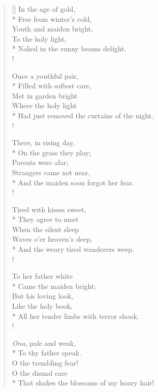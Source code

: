 \documentclass[MAIN]{subfiles}
\begin{document}
\settowidth{\versewidth}{Had just removed the curtains of the night.}
\begin{verse}[\versewidth]
\vin In the age of gold,\\*
\vin Free from winter's cold,\\
\vin Youth and maiden bright,\\
\vin To the holy light,\\*
Naked in the sunny beams delight.\\!

\vin Once a youthful pair,\\*
\vin Filled with softest care,\\
\vin Met in garden bright\\
\vin Where the holy light\\*
Had just removed the curtains of the night.\\!

\vin There, in rising day,\\*
\vin On the grass they play;\\
\vin Parents were afar;\\
\vin Strangers came not near,\\*
And the maiden soon forgot her fear.\\!

\vin Tired with kisses sweet,\\*
\vin They agree to meet\\
\vin When the silent sleep\\
\vin Waves o'er heaven's deep,\\*
And the weary tired wanderers weep.\\!

\vin To her father white\\*
\vin Came the maiden bright;\\
\vin But his loving look,\\
\vin Like the holy book,\\*
All her tender limbs with terror shook.\\!

\vin \emph{Ona}, pale and weak,\\*
\vin To thy father speak.\\
\vin O the trembling fear!\\
\vin O the dismal care\\*
That shakes the blossoms of my hoary hair!
\end{verse}
\end{document}
